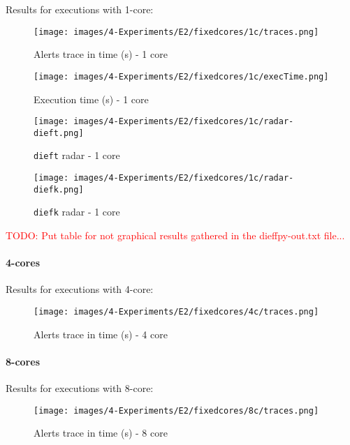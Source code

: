 Results for executions with 1-core:

\begin{figure}[H]
  \centering
  \texttt{[image: images/4-Experiments/E2/fixedcores/1c/traces.png]}
  \caption{Alerts trace in time (s) - 1 core}
\end{figure}

\begin{figure}[H]
  \centering
  \texttt{[image: images/4-Experiments/E2/fixedcores/1c/execTime.png]}
  \caption{Execution time (s) - 1 core}
\end{figure}

\begin{figure}[H]
  \centering
  \texttt{[image: images/4-Experiments/E2/fixedcores/1c/radar-dieft.png]}
  \caption{\texttt{dieft} radar - 1 core}
\end{figure}

\begin{figure}[H]
  \centering
  \texttt{[image: images/4-Experiments/E2/fixedcores/1c/radar-diefk.png]}
  \caption{\texttt{diefk} radar - 1 core}
\end{figure}

\textcolor{red}{TODO: Put table for not graphical results gathered in the dieffpy-out.txt file...}

\paragraph{4-cores\\}

Results for executions with 4-core:

\begin{figure}[H]
  \centering
  \texttt{[image: images/4-Experiments/E2/fixedcores/4c/traces.png]}
  \caption{Alerts trace in time (s) - 4 core}
\end{figure}

\paragraph{8-cores\\}

Results for executions with 8-core:

\begin{figure}[H]
  \centering
  \texttt{[image: images/4-Experiments/E2/fixedcores/8c/traces.png]}
  \caption{Alerts trace in time (s) - 8 core}
\end{figure}

